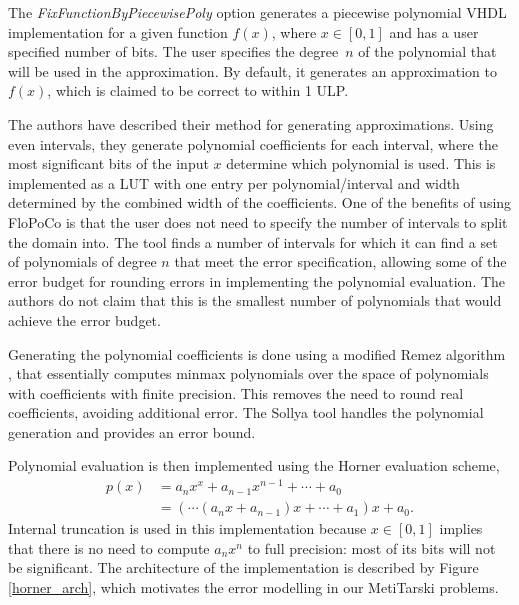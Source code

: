 \documentclass{fac}
\begin{document}
The \textit{FixFunctionByPiecewisePoly} option generates a piecewise polynomial VHDL implementation for a given function $f(x)$, where $x\in [0,1]$ and has a user specified number of bits. The user specifies the degree~$n$ of the polynomial that will be used in the approximation. By default, it generates an approximation to $f(x)$, which is claimed to be correct to within 1 ULP. 

The authors \cite{DinJolPas2010-poly} have described their method for generating approximations.
Using even intervals, they generate polynomial coefficients for each interval, where the most significant bits of the input $x$ determine which polynomial is used. This is implemented as a LUT with one entry per polynomial/interval and width determined by the combined width of the coefficients. One of the benefits of using FloPoCo is that the user does not need to specify the number of intervals to split the domain into. The tool finds a number of intervals for which it can find a set of polynomials of degree $n$ that meet the error specification, allowing some of the error budget for rounding errors in implementing the polynomial evaluation. The authors do not claim that this is the smallest number of polynomials that would achieve the error budget. 

Generating the polynomial coefficients is done using a modified Remez algorithm \cite{brisebarre2007efficient}, that essentially computes minmax polynomials over the space of polynomials with coefficients with finite precision. This removes the need to round real coefficients, avoiding additional error. The Sollya tool \cite{ChevillardJoldesLauter2010} handles the polynomial generation and provides an error bound. 

Polynomial evaluation is then implemented using the Horner evaluation scheme, 
\begin{align*}
    p(x) &= a_n x^x + a_{n-1}x^{n-1} + \cdots + a_0 \\
         &= (\cdots(a_n x + a_{n-1})x + \cdots + a_1)x + a_0.
\end{align*}
Internal truncation is used in this implementation because $x\in [0,1]$ implies that there is no need to compute $a_n x^n$ to full precision: most of its bits will not be significant. The architecture of the implementation is described by Figure \ref{horner_arch}, which motivates the error modelling in our MetiTarski problems.
\end{document}
